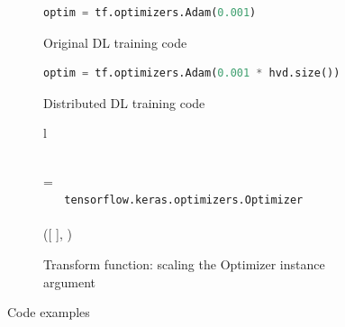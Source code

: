 \pagebreak
\begin{figure}[ht!]
    \centering

    \begin{subfigure}[t]{0.48\textwidth}
        \begin{lstlisting}[language=Python]
        optim = tf.optimizers.Adam(0.001)\end{lstlisting}
        \caption{Original DL training code}
    \end{subfigure}

    \hspace{5mm}

    \begin{subfigure}[t]{0.48\textwidth}
        \begin{lstlisting}[language=Python]
        optim = tf.optimizers.Adam(0.001 * hvd.size())\end{lstlisting}
        \caption{Distributed DL training code}
    \end{subfigure}

    \begin{subfigure}[t]{\textwidth}
        \centering
        \begin{tabular}{l}

            \\

             = \\

            \inden \ktif ~  \ktsubtysubs{\smodenv} ~ {\tt tensorflow.keras.optimizers.Optimizer}\\
            \inden \ktthen \\

            \inden\inden ([ \oassign {} ], )\\

        \end{tabular}
        \caption{Transform function: scaling the Optimizer instance argument}
        \label{fig:trans:fn02}
    \end{subfigure}
    \caption{Code examples}
    \label{fig:trans:ex02}
\end{figure}



